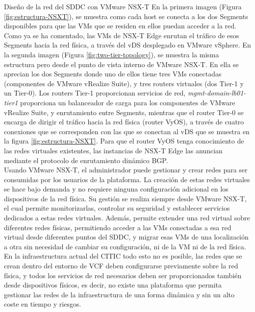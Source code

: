 \begin{subsubsection}{Diseño de la red del SDDC con VMware NSX-T}
    En la primera imagen (Figura \ref{fig:estructura-NSXT}), se muestra como cada host se conecta a los dos Segments disponibles para que las VMs que se residen en ellos puedan acceder a la red. Como ya se ha comentado, las VMs de NSX-T Edge enrutan el tráfico de esos Segments hacia la red física, a través del vDS desplegado en VMware vSphere. En la segunda imagen (Figura \ref{fig:two-tier-topology}), se muestra la misma estructura pero desde el punto de vista interno de VMware NSX-T. En ella se aprecian los dos Segments donde uno de ellos tiene tres VMs conectadas (componentes de VMware vRealize Suite), y tres routers virtuales (dos Tier-1 y un Tier-0). Los routers Tier-1 proporcionan servicios de red, \textit{mgmt-domain-lb01-tier1} proporciona un balanceador de carga para los componentes de VMware vRealize Suite, y enrutamiento entre Segments, mientras que el router Tier-0 se encarga de dirigir el tráfico hacia la red física (router VyOS), a través de cuatro conexiones que se corresponden con las que se conectan al vDS que se muestra en la figura \ref{fig:estructura-NSXT}. Para que el router VyOS tenga conocimiento de las redes virtuales existentes, las instancias de NSX-T Edge las anuncian mediante el protocolo de enrutamiento dinámico BGP.
    \\
    Usando VMware NSX-T, el administrador puede gestionar y crear redes para ser consumidas por los usuarios de la plataforma. La creación de estas redes virtuales se hace bajo demanda y no requiere ninguna configuración adicional en los dispositivos de la red física. Su gestión se realiza siempre desde VMware NSX-T, el cual permite monitorizarlas, controlar su seguridad y establecer servicios dedicados a estas redes virtuales. Además, permite extender una red virtual sobre diferentes redes físicas, permitiendo acceder a las VMs conectadas a esa red virtual desde diferentes puntos del SDDC, y migrar esas VMs de una localización a otra sin necesidad de cambiar su configuración, ni de la VM ni de la red física. En la infraestructura actual del CITIC todo esto no es posible, las redes que se crean dentro del entorno de VCF deben configurarse previamente sobre la red física, y todos los servicios de red necesarios deben ser proporcionados también desde dispositivos físicos, es decir, no existe una plataforma que permita gestionar las redes de la infraestructura de una forma dinámica y sin un alto coste en tiempo y riesgos.
    
    
    

\end{subsubsection}
